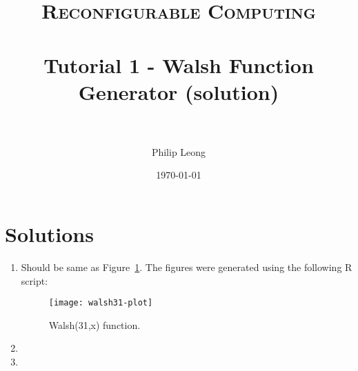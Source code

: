 \documentclass[paper=a4, fontsize=11pt]{scrartcl} %
\title{	
\normalfont \normalsize 
\textsc{Reconfigurable Computing} \\ [25pt] %
\horrule{0.5pt} \\[0.4cm] %
\huge Tutorial 1 - Walsh Function Generator (solution) \\ %
\horrule{2pt} \\[0.5cm] %
}
\author{Philip Leong} %
\date{\normalsize\today} %
\begin{document}
\maketitle %



\newpage
\appendix
\section{Solutions}

\begin{enumerate}
\item Should be same as Figure~\ref{fg:walsh31}. The figures were generated
using the following R script:


\begin{figure}
\begin{center}
\texttt{[image: walsh31-plot]}
\caption{Walsh(31,x) function.}
\label{fg:walsh31}
\end{center}
\end{figure}

\item 



\item 


\end{enumerate}

{}

\end{document}
